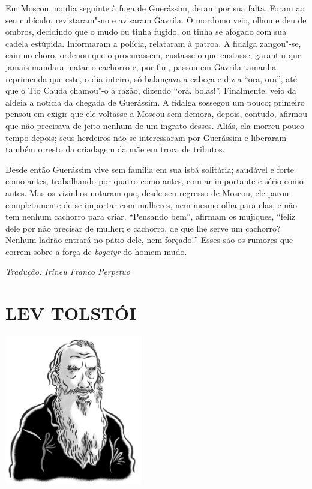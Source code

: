 Em Moscou, no dia seguinte à fuga de Guerássim, deram por sua falta.
Foram ao seu cubículo, revistaram"-no e avisaram Gavrila. O mordomo veio,
olhou e deu de ombros, decidindo que o mudo ou tinha fugido, ou tinha se
afogado com sua cadela estúpida. Informaram a polícia, relataram à
patroa. A fidalga zangou"-se, caiu no choro, ordenou que o procurassem,
custasse o que custasse, garantiu que jamais mandara matar o cachorro e,
por fim, passou em Gavrila tamanha reprimenda que este, o dia inteiro,
só balançava a cabeça e dizia ``ora, ora'', até que o Tio Cauda chamou"-o
à razão, dizendo ``ora, bolas!''. Finalmente, veio da aldeia a notícia
da chegada de Guerássim. A fidalga sossegou um pouco; primeiro pensou em
exigir que ele voltasse a Moscou sem demora, depois, contudo, afirmou
que não precisava de jeito nenhum de um ingrato desses. Aliás, ela
morreu pouco tempo depois; seus herdeiros não se interessaram por
Guerássim e liberaram também o resto da criadagem da mãe em troca de
tributos.

Desde então Guerássim vive sem família em sua isbá solitária; saudável e
forte como antes, trabalhando por quatro como antes, com ar importante e
sério como antes. Mas os vizinhos notaram que, desde seu regresso de
Moscou, ele parou completamente de se importar com mulheres, nem mesmo
olha para elas, e não tem nenhum cachorro para criar. ``Pensando bem'',
afirmam os mujiques, ``feliz dele por não precisar de mulher; e
cachorro, de que lhe serve um cachorro? Nenhum ladrão entrará no pátio
dele, nem forçado!'' Esses são os rumores que correm sobre a força de
\emph{bogatyr} do homem mudo. \enlargethispage{\baselineskip}


{\footnotesize\hfill\emph{Tradução: Irineu Franco Perpetuo}}


\part[LEV TOLSTÓI]{LEV TOLSTÓI }

\pagebreak
\thispagestyle{empty}
\mbox{}
\vfill
\begin{center}
\includegraphics[width=6cm]{./imgs/autor4.jpg}
\end{center}



